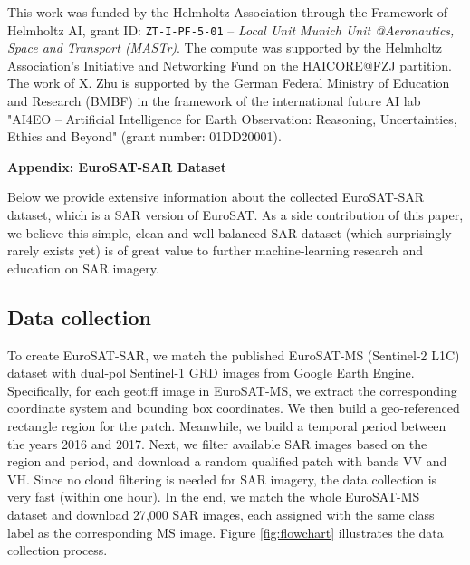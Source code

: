 \documentclass[lettersize,journal]{IEEEtran}
\begin{document}
This work was funded by the Helmholtz Association through the Framework of Helmholtz AI, grant ID: \texttt{ZT-I-PF-5-01} -- \textit{Local Unit Munich Unit @Aeronautics, Space and Transport (MASTr)}. The compute was supported by the Helmholtz Association's Initiative and Networking Fund on the HAICORE@FZJ partition. The work of X. Zhu is supported by the German Federal Ministry of Education and Research (BMBF) in the framework of the international future AI lab "AI4EO -- Artificial Intelligence for Earth Observation: Reasoning, Uncertainties, Ethics and Beyond" (grant number: 01DD20001).





{
\printbibliography
}

\clearpage
\newpage

\begin{figure*}
    \centering
\begin{minipage}{\textwidth}
\centering
\large\textbf{Appendix: EuroSAT-SAR Dataset}
\end{minipage}
\end{figure*}




Below we provide extensive information about the collected EuroSAT-SAR dataset, which is a SAR version of EuroSAT. As a side contribution of this paper, we believe this simple, clean and well-balanced SAR dataset (which surprisingly rarely exists yet) is of great value to further machine-learning research and education on SAR imagery.

\vspace{-0.5em}
\subsection{\textbf{Data collection}}
To create EuroSAT-SAR, we match the published EuroSAT-MS (Sentinel-2 L1C) dataset with dual-pol Sentinel-1 GRD images from Google Earth Engine. Specifically, for each geotiff image in EuroSAT-MS, we extract the corresponding coordinate system and bounding box coordinates. We then build a geo-referenced rectangle region for the patch. Meanwhile, we build a temporal period between the years 2016 and 2017. Next, we filter available SAR images based on the region and period, and download a random qualified patch with bands VV and VH. Since no cloud filtering is needed for SAR imagery, the data collection is very fast (within one hour). In the end, we match the whole EuroSAT-MS dataset and download 27,000 SAR images, each assigned with the same class label as the corresponding MS image. Figure \ref{fig:flowchart} illustrates the data collection process.
\end{document}
